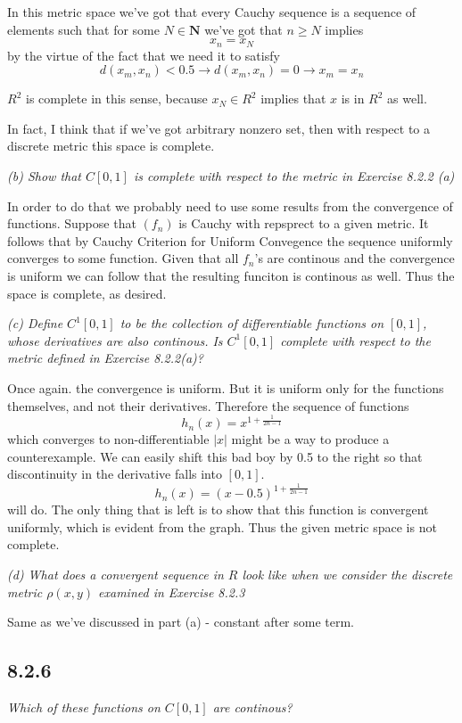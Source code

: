 \documentclass[11pt,oneside,titlepage]{book}
\begin{document}
In this metric space we've got that every Cauchy sequence is a sequence
of elements such that for some $N \in \textbf{N}$ we've got that $n \geq N$ implies 
$$x_n = x_N$$
by the virtue of the fact that we need it to satisfy
$$d(x_m, x_n) < 0.5 \to d(x_m, x_n) = 0 \to x_m = x_n$$

$R^2$ is complete in this sense, because $x_N \in R^2$ implies that $x$ is in $R^2$ as well.

In fact, I think that if we've got arbitrary nonzero set, then with respect to
a discrete metric this space is complete.

\textit{(b) Show that $C[0, 1]$ is complete with respect to the metric in Exercise 8.2.2 (a)}

In order to do that we probably need to use some results from the convergence of functions.
Suppose that $(f_n)$ is Cauchy with repsprect to a given metric. It follows that by
Cauchy Criterion for Uniform Convegence the sequence uniformly converges to some function.
Given that all $f_n$'s are continous and the convergence is uniform we can follow that
the resulting funciton is continous as well. Thus the space is complete, as desired.

\textit{(c) Define $C^1[0,1]$ to be the collection of differentiable functions on $[0, 1]$,
  whose derivatives are also continous. Is $C^1[0, 1]$ complete with respect to the metric
  defined in Exercise 8.2.2(a)?}

Once again. the convergence is uniform. But it is uniform only for the functions themselves,
and not their derivatives. Therefore the sequence of functions
$$h_n(x) = x^{1 + \frac{1}{2n - 1}}$$
which converges to non-differentiable $|x|$ might be a way to produce a counterexample.
We can easily shift this bad boy by 0.5 to the right so that discontinuity in the derivative
falls into $[0, 1]$.
$$h_n(x) = (x - 0.5)^{1 + \frac{1}{2n - 1}}$$
will do. The only thing that is left is to show that this function is convergent uniformly,
which is evident from the graph. Thus the given metric space is not complete.

\textit{(d) What does a convergent sequence in $R$ look like when we consider the discrete
  metric $\rho (x, y)$ examined in Exercise 8.2.3}

Same as we've discussed in part (a) - constant after some term.

\subsection*{8.2.6}
\textit{Which of these functions on $C[0, 1]$ are continous?}
\end{document}
